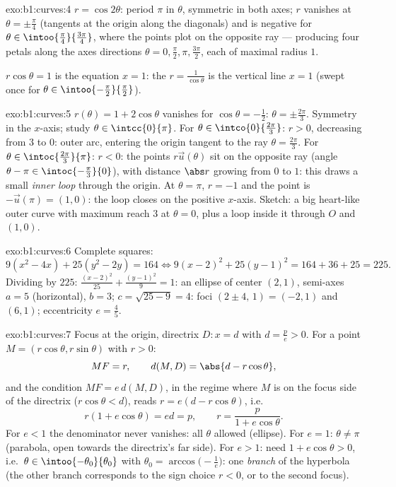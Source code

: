 \begin{solution}{exo:b1:curves:4}
$r = \cos 2\theta$: period $\pi$ in $\theta$, symmetric in both
axes; $r$ vanishes at $\theta = \pm\frac\pi4$ (tangents at the
origin along the diagonals) and is negative for $\theta \in
\intoo{\frac\pi4}{\frac{3\pi}{4}}$, where the points plot on the
opposite ray --- producing four petals along the axes directions
$\theta = 0, \frac\pi2, \pi, \frac{3\pi}{2}$, each of maximal
radius $1$.

$r\cos\theta = 1$ is the equation $x = 1$: the  $r =
\frac{1}{\cos\theta}$ is the vertical line $x = 1$ (swept once for
$\theta \in \intoo{-\frac\pi2}{\frac\pi2}$).
\end{solution}

\begin{solution}{exo:b1:curves:5}
$r(\theta) = 1 + 2\cos\theta$ vanishes for $\cos\theta = -\frac12$:
$\theta = \pm\frac{2\pi}{3}$. Symmetry in the $x$-axis; study
$\theta \in \intcc{0}{\pi}$. For $\theta \in
\intco{0}{\frac{2\pi}{3}}$: $r > 0$, decreasing from $3$ to $0$:
outer arc, entering the origin tangent to the ray $\theta =
\frac{2\pi}{3}$. For $\theta \in \intoc{\frac{2\pi}{3}}{\pi}$: $r <
0$: the points $r\vec u(\theta)$ sit on the opposite ray (angle
$\theta - \pi \in \intoc{-\frac\pi3}{0}$), with distance $\abs r$
growing from $0$ to $1$: this draws a small \emph{inner loop}
through the origin. At $\theta = \pi$, $r = -1$ and the point is
$-\vec u(\pi) = (1, 0)$: the loop closes on the positive $x$-axis.
Sketch: a big heart-like outer curve
with maximum reach $3$ at $\theta = 0$, plus a loop inside it
through $O$ and $(1,0)$.
\end{solution}

\begin{solution}{exo:b1:curves:6}
Complete squares:
\[
9(x^2 - 4x) + 25(y^2 - 2y) = 164
\iff 9(x-2)^2 + 25(y-1)^2 = 164 + 36 + 25 = 225 .
\]
Dividing by $225$: $\frac{(x-2)^2}{25} + \frac{(y-1)^2}{9} = 1$: an
ellipse of center $(2, 1)$, semi-axes $a = 5$ (horizontal), $b =
3$; $c = \sqrt{25 - 9} = 4$: foci $(2 \pm 4,\, 1) = (-2, 1)$ and
$(6, 1)$; eccentricity $e = \frac45$.
\end{solution}

\begin{solution}{exo:b1:curves:7}
Focus at the origin, directrix $D: x = d$ with $d = \frac pe > 0$.
For a point $M = (r\cos\theta, r\sin\theta)$ with $r > 0$:
\[
MF = r,
\qquad
d(M, D) = \abs{d - r\cos\theta},
\]
and the  condition $MF = e\,d(M, D)$, in the regime where $M$
is on the focus side of the directrix ($r\cos\theta < d$), reads $r
= e(d - r\cos\theta)$, i.e.
\[
r(1 + e\cos\theta) = ed = p,
\qquad
r = \frac{p}{1 + e\cos\theta} .
\]
For $e < 1$ the denominator never vanishes: all $\theta$ allowed
(ellipse). For $e = 1$: $\theta \neq \pi$ (parabola, open towards
the directrix's far side). For $e > 1$: need $1 + e\cos\theta > 0$,
i.e.\ $\theta \in \intoo{-\theta_0}{\theta_0}$ with $\theta_0 =
\arccos\bigl(-\frac1e\bigr)$: one \emph{branch} of the hyperbola
(the other branch corresponds to the sign choice $r < 0$, or to the
second focus).
\end{solution}

